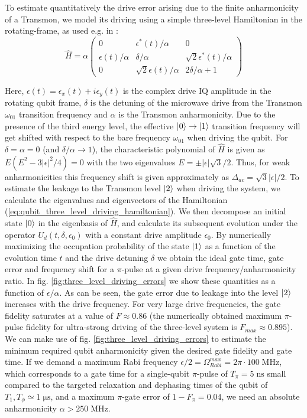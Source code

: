 To estimate quantitatively the drive error arising due to the finite anharmonicity of a Transmon, we model its driving using a simple three-level Hamiltonian in the rotating-frame, as used e.g. in \cite{motzoi_simple_2009}:
%
\begin{equation}
\hat{H} = \alpha\left(
						 \begin{array}{ccc}
						0 & \epsilon^*(t)/\alpha & 0 \\
						\epsilon(t)/\alpha & \delta/\alpha & \sqrt{2}\epsilon^*(t)/\alpha \\
						0 & \sqrt{2}\epsilon(t)/\alpha & 2\delta/\alpha + 1
						\end{array}
					\right) \label{eq:qubit_three_level_driving_hamiltonian}
\end{equation}
%

Here, $\epsilon(t) = \epsilon_x(t)+i\epsilon_y(t)$ is the complex drive IQ amplitude in the rotating qubit frame, $\delta$ is the detuning of the microwave drive from the Transmon $\omega_{01}$ transition frequency and $\alpha$ is the Transmon anharmonicity. Due to the presence of the third energy level, the effective $\left| 0 \right>\to\left| 1 \right>$ transition frequency will get shifted with respect to the bare frequency $\omega_{01}$ when driving the qubit. For $\delta = \alpha = 0$ (and $\delta/\alpha\to 1$), the characteristic polynomial of $\hat{H}$ is given as $E(E^2-3|\epsilon|^2/4) = 0$ with the two eigenvalues $E=\pm |\epsilon|\sqrt{3}/2$. Thus, for weak anharmonicities this frequency shift is given approximately as $\Delta_{ac}=\sqrt{3}|\epsilon|/2$. To estimate the leakage to the Transmon level $\left| 2 \right>$ when driving the system, we calculate the eigenvalues and eigenvectors of the Hamiltonian (\ref{eq:qubit_three_level_driving_hamiltonian}). We then decompose an initial state $\left| 0 \right>$ in the eigenbasis of $\hat{H}$, and calculate its subsequent evolution under the operator $U_d(t,\delta,\epsilon_0)$ with a constant drive amplitude $\epsilon_0$. By numerically maximizing the occupation probability of the state $\left| 1 \right>$ as a function of the evolution time $t$ and the drive detuning $\delta$ we obtain the ideal gate time, gate error and frequency shift for a $\pi$-pulse at a given drive frequency/anharmonicity ratio. In fig. \ref{fig:three_level_driving_errors} we show these quantities as a function of $\epsilon/\alpha$. As can be seen, the gate error due to leakage into the level $\left| 2 \right>$ increases with the drive frequency. For very large drive frequencies, the gate fidelity saturates at a value of $F\approx 0.86$ (the numerically obtained maximum $\pi$-pulse fidelity for ultra-strong driving of the three-level system is $F_{max}\approx 0.895$). We can make use of fig. \ref{fig:three_level_driving_errors} to estimate the minimum required qubit anharmonicity given the desired gate fidelity and gate time. If we demand a maximum Rabi frequency $\epsilon/2=\Omega_{Rabi}^{max}=2\pi\cdot 100\;\mathrm{MHz}$, which corresponds to a gate time for a single-qubit $\pi$-pulse of $T_\pi=5\;\mathrm{ns}$ small compared to the targeted relaxation and dephasing times of the qubit of $T_1,T_\phi\simeq 1\;\mathrm{\mu s}$, and a maximum $\pi$-gate error of $1-F_\pi = 0.04$, we need an absolute anharmonicity $\alpha > 250\;\mathrm{MHz}$.


